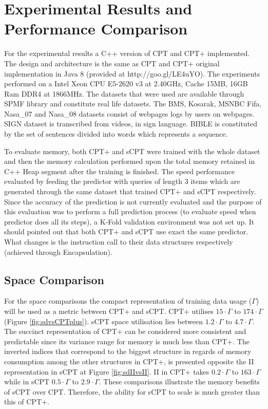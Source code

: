 \section{Experimental Results and Performance Comparison} \label{experimental}
For the experimental results a C++ version of CPT and CPT+ implemented. The design and architecture is the same as CPT and CPT+ original implementation in Java 8 (provided at http://goo.gl/LE4uYO). The experiments performed on a Intel Xeon CPU E5-2620 v3 at 2.40GHz, Cache 15MB, 16GB Ram DDR4 at 1866MHz. The datasets that were used are available through SPMF library \cite{spmf} and constitute real life datasets. The BMS, Kosarak, MSNBC Fifa, Nasa\_07 and Nasa\_08 datasets consist of webpages logs by users on webpages. SIGN dataset is transcribed from videos, in sign language. BIBLE is constituted by the set of sentences divided into words which represents a sequence. 
\par To evaluate memory, both CPT+ and sCPT were trained with the whole dataset and then the memory calculation performed upon the total memory retained in C++ Heap segment after the training is finished. The speed performance evaluated by feeding the predictor with queries of length 3 items which are generated through the same dataset that trained CPT+ and sCPT respectively. Since the accuracy of the prediction is not currently evaluated and the purpose of this evaluation was to perform a full prediction process (to evaluate speed when predictor does all its steps), a K-Fold \cite{Kohavi} validation environment was not set up. It should pointed out that both CPT+ and sCPT use exact the same predictor. What changes is the instruction call to their data structures respectively (achieved through Encapsulation).

\subsection*{Space Comparison}
For the space comparisons the compact representation of training data usage ($\Gamma$) will be used as a metric between CPT+ and sCPT. CPT+ utilises $15 \cdot \Gamma$ to $174 \cdot \Gamma$ (Figure \ref{fig:sdvsCPTplus}). sCPT space utilisation lies between $1.2 \cdot \Gamma$ to $4.7 \cdot \Gamma$. The succinct representation of CPT+ can be considered more consistent and predictable since its variance range for memory is much less than CPT+. The inverted indices that correspond to the biggest structure in regards of memory consumption among the other structures in CPT+, is presented opposite the II representation in sCPT at Figure \ref{fig:sdIIvsII}. II in CPT+ takes $0.2 \cdot \Gamma$ to $163 \cdot \Gamma$ while in sCPT $0.5 \cdot \Gamma$ to $2.9 \cdot \Gamma$. These comparisons illustrate the memory benefits of sCPT over CPT. Therefore, the ability for sCPT to scale is much greater than this of CPT+.
